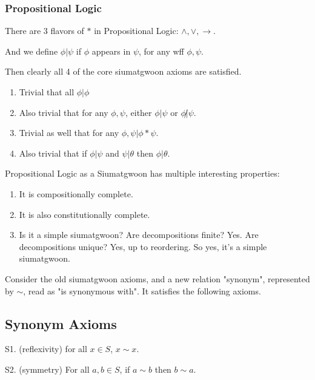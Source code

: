 \subsubsection{Propositional Logic}

There are 3 flavors of $*$ in Propositional Logic: $\wedge, \vee, \rightarrow$. 

And we define $\phi | \psi$ if $\phi$ appears in $\psi$, for any wff $\phi, \psi$.

Then clearly all 4 of the core siumatgwoon axioms are satisfied. 

\begin{enumerate}
\item Trivial that all $\phi | \phi$
\item Also trivial that for any $\phi, \psi$, either $\phi|\psi$ or $\phi\not|\psi$.
\item Trivial as well that for any $\phi,\psi | \phi * \psi$.
\item Also trivial that if $\phi | \psi$ and $\psi | \theta$ then $\phi | \theta$.
\end{enumerate}

Propositional Logic as a Siumatgwoon has multiple interesting properties: 

\begin{enumerate}
\item It is compositionally complete. 
\item It is also constitutionally complete. 
\item Is it a simple siumatgwoon? Are decompositions finite? Yes. Are decompositions unique? Yes, up to reordering. So yes, it's a simple siumatgwoon.


\end{enumerate}

Consider the old siumatgwoon axioms, and a new relation "synonym", represented by $\sim$, read as "is synonymous with". It satisfies the following axioms.

\subsection{Synonym Axioms}

\begin{axiom}[Reflexivity]\label{ax:syn-reflex}
S1. (reflexivity) for all $x\in S$, $x\sim x$.
\end{axiom}

\begin{axiom}[Symmetry]\label{ax:syn-sym}
S2. (symmetry) For all $a,b\in S$, if $a\sim b$ then $b\sim a$.
\end{axiom}

